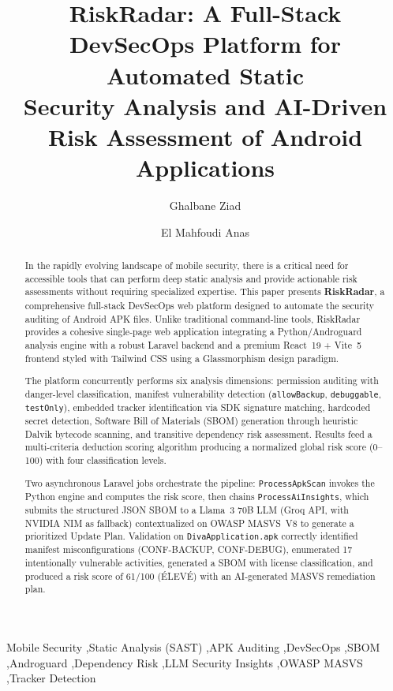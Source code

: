 \documentclass[3p,times]{elsarticle}
\begin{document}
\begin{frontmatter}

\title{RiskRadar: A Full-Stack DevSecOps Platform for Automated Static\\
Security Analysis and AI-Driven Risk Assessment of Android Applications}

\author[1]{Ghalbane Ziad}

\author[1]{El Mahfoudi Anas}

\address[1]{Mobile Security \& DevSecOps Laboratory, Faculty of Sciences,\\
Department of Computer Science}


\begin{abstract}
In the rapidly evolving landscape of mobile security, there is a critical need
for accessible tools that can perform deep static analysis and provide
actionable risk assessments without requiring specialized expertise. This paper
presents \textbf{RiskRadar}, a comprehensive full-stack DevSecOps web platform
designed to automate the security auditing of Android APK files. Unlike
traditional command-line tools, RiskRadar provides a cohesive single-page web
application integrating a Python/Androguard analysis engine with a robust
Laravel backend and a premium React~19 + Vite~5 frontend styled with
Tailwind CSS using a Glassmorphism design paradigm.

The platform concurrently performs six analysis dimensions: permission auditing
with danger-level classification, manifest vulnerability detection
(\texttt{allowBackup}, \texttt{debuggable}, \texttt{testOnly}), embedded
tracker identification via SDK signature matching, hardcoded secret detection,
Software Bill of Materials (SBOM) generation through heuristic Dalvik bytecode
scanning, and transitive dependency risk assessment. Results feed a
multi-criteria deduction scoring algorithm producing a normalized global risk
score (0--100) with four classification levels.

Two asynchronous Laravel jobs orchestrate the pipeline: \texttt{ProcessApkScan}
invokes the Python engine and computes the risk score, then chains
\texttt{ProcessAiInsights}, which submits the structured JSON SBOM to a Llama~3
70B LLM (Groq API, with NVIDIA NIM as fallback) contextualized on OWASP
MASVS~V8 to generate a prioritized Update Plan. Validation on
\texttt{DivaApplication.apk} correctly identified manifest misconfigurations
(CONF-BACKUP, CONF-DEBUG), enumerated 17 intentionally vulnerable activities,
generated a SBOM with license classification, and produced a risk score of
61/100 (\'{E}LEV\'{E}) with an AI-generated MASVS remediation plan.
\end{abstract}

\begin{keyword}
Mobile Security \sep Static Analysis (SAST) \sep APK Auditing \sep DevSecOps
\sep SBOM \sep Androguard \sep Dependency Risk \sep LLM Security Insights
\sep OWASP MASVS \sep Tracker Detection
\end{keyword}

\end{frontmatter}
\end{document}
